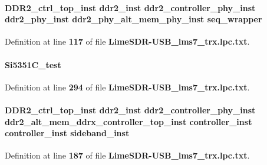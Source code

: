 \paragraph[{seq\+\_\+wrapper}]{ {\bf D\+D\+R2\+\_\+ctrl\+\_\+top\+\_\+inst} {\bf ddr2\+\_\+inst} {\bf ddr2\+\_\+controller\+\_\+phy\+\_\+inst} {\bf ddr2\+\_\+phy\+\_\+inst} {\bf ddr2\+\_\+phy\+\_\+alt\+\_\+mem\+\_\+phy\+\_\+inst} seq\+\_\+wrapper}\label{LimeSDR-USB__lms7__trx_8lpc_8txt_a4f54683dd249fd665e66bb3168e12e10}


Definition at line {\bf 117} of file {\bf Lime\+S\+D\+R-\/\+U\+S\+B\+\_\+lms7\+\_\+trx.\+lpc.\+txt}.

\paragraph[{Si5351\+C\+\_\+test}]{ Si5351\+C\+\_\+test}\label{LimeSDR-USB__lms7__trx_8lpc_8txt_ae24afae995dec18a06b53d3cf20cb150}


Definition at line {\bf 294} of file {\bf Lime\+S\+D\+R-\/\+U\+S\+B\+\_\+lms7\+\_\+trx.\+lpc.\+txt}.

\paragraph[{sideband\+\_\+inst}]{ {\bf D\+D\+R2\+\_\+ctrl\+\_\+top\+\_\+inst} {\bf ddr2\+\_\+inst} {\bf ddr2\+\_\+controller\+\_\+phy\+\_\+inst} {\bf ddr2\+\_\+alt\+\_\+mem\+\_\+ddrx\+\_\+controller\+\_\+top\+\_\+inst} {\bf controller\+\_\+inst} {\bf controller\+\_\+inst} sideband\+\_\+inst}\label{LimeSDR-USB__lms7__trx_8lpc_8txt_a2eece25eebba8f4f84bc221fbd83d33a}


Definition at line {\bf 187} of file {\bf Lime\+S\+D\+R-\/\+U\+S\+B\+\_\+lms7\+\_\+trx.\+lpc.\+txt}.

